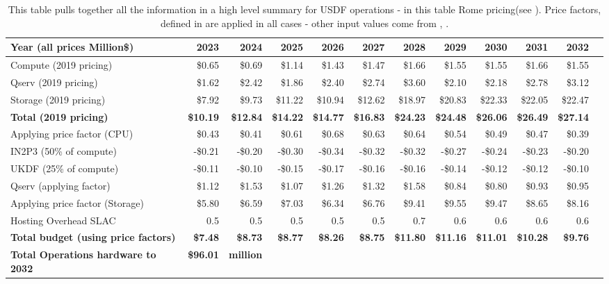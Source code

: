 \tiny \begin{longtable} { |p{}  |r  |r  |r  |r  |r  |r  |r  |r  |r  |r  |r |} 
\caption{This table pulls together all the information in a high level summary for USDF operations - in this table Rome pricing(see ). Price factors, defined in  are applied in all cases - other input values come from , .
 \label{tab:opsSumUSDF}}\\ 
\hline 
\textbf{Year  (all prices Million\$)}&\textbf{2023}&\textbf{2024}&\textbf{2025}&\textbf{2026}&\textbf{2027}&\textbf{2028}&\textbf{2029}&\textbf{2030}&\textbf{2031}&\textbf{2032} \\ \hline
{Compute (2019 pricing)}&{\$0.65}&{\$0.69}&{\$1.14}&{\$1.43}&{\$1.47}&{\$1.66}&{\$1.55}&{\$1.55}&{\$1.66}&{\$1.55} \\ \hline
{Qserv (2019 pricing)}&{\$1.62}&{\$2.42}&{\$1.86}&{\$2.40}&{\$2.74}&{\$3.60}&{\$2.10}&{\$2.18}&{\$2.78}&{\$3.12} \\ \hline
{Storage (2019 pricing)}&{\$7.92}&{\$9.73}&{\$11.22}&{\$10.94}&{\$12.62}&{\$18.97}&{\$20.83}&{\$22.33}&{\$22.05}&{\$22.47} \\ \hline
\textbf{Total (2019 pricing)}&\textbf{\$10.19}&\textbf{\$12.84}&\textbf{\$14.22}&\textbf{\$14.77}&\textbf{\$16.83}&\textbf{\$24.23}&\textbf{\$24.48}&\textbf{\$26.06}&\textbf{\$26.49}&\textbf{\$27.14} \\ \hline
{Applying price factor (CPU)}&{\$0.43}&{\$0.41}&{\$0.61}&{\$0.68}&{\$0.63}&{\$0.64}&{\$0.54}&{\$0.49}&{\$0.47}&{\$0.39} \\ \hline
{IN2P3 (50\% of compute)}&{-\$0.21}&{-\$0.20}&{-\$0.30}&{-\$0.34}&{-\$0.32}&{-\$0.32}&{-\$0.27}&{-\$0.24}&{-\$0.23}&{-\$0.20} \\ \hline
{UKDF (25\% of compute)}&{-\$0.11}&{-\$0.10}&{-\$0.15}&{-\$0.17}&{-\$0.16}&{-\$0.16}&{-\$0.14}&{-\$0.12}&{-\$0.12}&{-\$0.10} \\ \hline
{Qserv (applying factor)}&{\$1.12}&{\$1.53}&{\$1.07}&{\$1.26}&{\$1.32}&{\$1.58}&{\$0.84}&{\$0.80}&{\$0.93}&{\$0.95} \\ \hline
{Applying price factor (Storage)}&{\$5.80}&{\$6.59}&{\$7.03}&{\$6.34}&{\$6.76}&{\$9.41}&{\$9.55}&{\$9.47}&{\$8.65}&{\$8.16} \\ \hline
{Hosting Overhead SLAC
}&{0.5}&{0.5}&{0.5}&{0.5}&{0.5}&{0.7}&{0.6}&{0.6}&{0.6}&{0.6} \\ \hline
\textbf{Total budget (using price factors)}&\textbf{\$7.48}&\textbf{\$8.73}&\textbf{\$8.77}&\textbf{\$8.26}&\textbf{\$8.75}&\textbf{\$11.80}&\textbf{\$11.16}&\textbf{\$11.01}&\textbf{\$10.28}&\textbf{\$9.76} \\ \hline
\textbf{Total Operations hardware to 2032 }&\textbf{\$96.01}&\textbf{million}&&&&&&&& \\ \hline
\end{longtable} \normalsize
